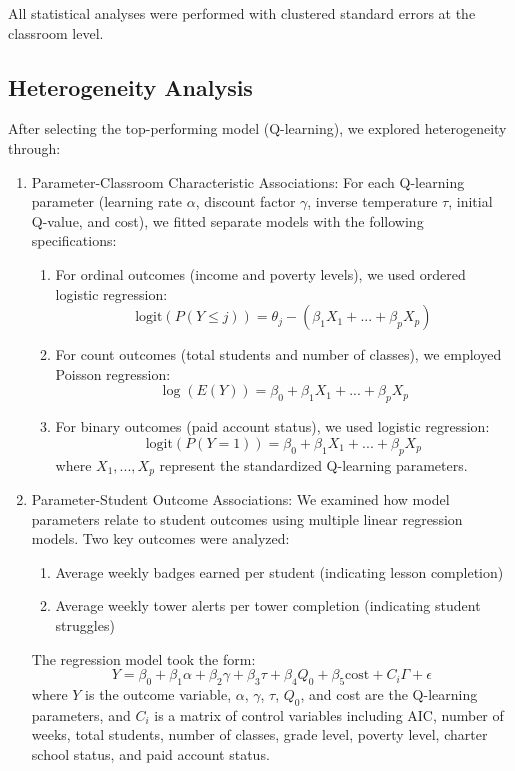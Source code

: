 \documentclass[
  number,
  preprint,
  3p,
  onecolumn]{elsarticle}
\providecommand{\tightlist}{%
  \setlength{\itemsep}{0pt}\setlength{\parskip}{0pt}}\usepackage{longtable,booktabs,array}
\begin{document}
All statistical analyses were performed with clustered standard errors
at the classroom level.

\subsection{Heterogeneity Analysis}\label{heterogeneity-analysis}

After selecting the top-performing model (Q-learning), we explored
heterogeneity through:

\begin{enumerate}
\def\labelenumi{\arabic{enumi}.}
\item
  Parameter-Classroom Characteristic Associations: For each Q-learning
  parameter (learning rate \(\alpha\), discount factor \(\gamma\),
  inverse temperature \(\tau\), initial Q-value, and cost), we fitted
  separate models with the following specifications:

  \begin{enumerate}
  \def\labelenumii{\alph{enumii})}
  \tightlist
  \item
    For ordinal outcomes (income and poverty levels), we used ordered
    logistic regression: \[
    \text{logit}(P(Y \leq j)) = \theta_j - (\beta_1X_1 + ... + \beta_pX_p)
    \]
  \item
    For count outcomes (total students and number of classes), we
    employed Poisson regression: \[
    \log(E(Y)) = \beta_0 + \beta_1X_1 + ... + \beta_pX_p
    \]
  \item
    For binary outcomes (paid account status), we used logistic
    regression: \[
    \text{logit}(P(Y=1)) = \beta_0 + \beta_1X_1 + ... + \beta_pX_p
    \] where \(X_1, ..., X_p\) represent the standardized Q-learning
    parameters.
  \end{enumerate}
\item
  Parameter-Student Outcome Associations: We examined how model
  parameters relate to student outcomes using multiple linear regression
  models. Two key outcomes were analyzed:

  \begin{enumerate}
  \def\labelenumii{\alph{enumii})}
  \tightlist
  \item
    Average weekly badges earned per student (indicating lesson
    completion)
  \item
    Average weekly tower alerts per tower completion (indicating student
    struggles)
  \end{enumerate}

  The regression model took the form: \[
  Y = \beta_0 + \beta_1\alpha + \beta_2\gamma + \beta_3\tau + \beta_4Q_0 + \beta_5\text{cost} + C_i\Gamma + \epsilon
  \] where \(Y\) is the outcome variable, \(\alpha\), \(\gamma\),
  \(\tau\), \(Q_0\), and cost are the Q-learning parameters, and \(C_i\)
  is a matrix of control variables including AIC, number of weeks, total
  students, number of classes, grade level, poverty level, charter
  school status, and paid account status.
\end{enumerate}
\end{document}
